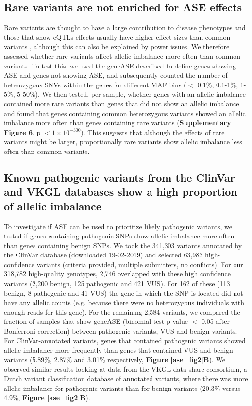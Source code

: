 \subsection{Rare variants are not enriched for ASE effects}
Rare variants are thought to have a large contribution to disease phenotypes and those that show eQTLs effects usually have higher effect sizes than common variants \cite{claringbouldGeneticArchitectureMolecular2017}, although this can also be explained by power issues. We therefore assessed whether rare variants affect allelic imbalance more often than common variants. To test this, we used the geneASE described to define genes showing ASE and genes not showing ASE, and subsequently counted the number of heterozygous SNVs within the genes for different MAF bins ($<$ 0.1\%, 0.1-1\%, 1-5\%, 5-50\%). We then tested, per sample, whether genes with an allelic imbalance contained more rare variants than genes that did not show an allelic imbalance and found that genes containing common heterozygous variants showed an allelic imbalance more often than genes containing rare variants (\textbf{Supplementary Figure 6}, p $< 1 \times 10^{-300}$). This suggests that although the effects of rare variants might be larger, proportionally rare variants show allelic imbalance less often than common variants. 

\subsection{Known pathogenic variants from the ClinVar and VKGL databases show a high proportion of allelic imbalance}
To investigate if ASE can be used to prioritize likely pathogenic variants, we tested if genes containing pathogenic SNPs show allelic imbalance more often than genes containing benign SNPs. We took the 341,303 variants annotated by the ClinVar database (downloaded 19-02-2019) and selected 63,983 high-confidence variants (criteria provided, multiple submitters, no conflicts). For our 318,782 high-quality genotypes, 2,746 overlapped with these high confidence variants (2,200 benign, 125 pathogenic and 421 VUS). For 162 of these (113 benign, 8 pathogenic and 41 VUS) the gene in which the SNP is located did not have any allelic counts (e.g. because there were no heterozygous individuals with enough reads for this gene). For the remaining 2,584 variants, we compared the fraction of samples that show geneASE (binomial test p-value $<$ 0.05 after Bonferroni correction) between pathogenic variants, VUS and benign variants. For ClinVar-annotated variants, genes that contained pathogenic variants showed allelic imbalance more frequently than genes that contained VUS and benign variants (5.89\%, 2.87\% and 3.01\% respectively, \textbf{Figure \ref{ase_fig2}B})\cite{landrumClinVarImprovingAccess2018}. We observed similar results looking at data from the VKGL data share consortium\cite{fokkemaDutchGenomeDiagnostic2019}, a Dutch variant classification database of annotated variants, where there was more allelic imbalance for pathogenic variants than for benign variants (20.3\% versus 4.9\%, \textbf{Figure \ref{ase_fig2}B}). 

